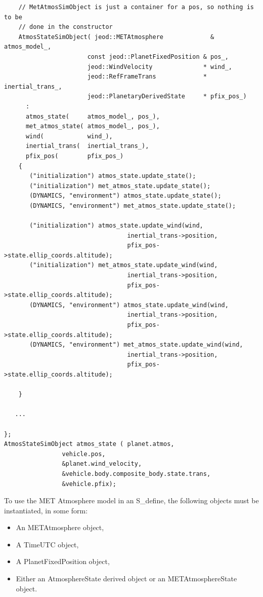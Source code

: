 \begin{verbatim}
    // MetAtmosSimObject is just a container for a pos, so nothing is to be
    // done in the constructor
    AtmosStateSimObject( jeod::METAtmosphere             & atmos_model_,
                       const jeod::PlanetFixedPosition & pos_,
                       jeod::WindVelocity              * wind_,
                       jeod::RefFrameTrans             * inertial_trans_,
                       jeod::PlanetaryDerivedState     * pfix_pos_)
      :
      atmos_state(     atmos_model_, pos_),
      met_atmos_state( atmos_model_, pos_),
      wind(            wind_),
      inertial_trans(  inertial_trans_),
      pfix_pos(        pfix_pos_)
    {
       ("initialization") atmos_state.update_state();
       ("initialization") met_atmos_state.update_state();
       (DYNAMICS, "environment") atmos_state.update_state();
       (DYNAMICS, "environment") met_atmos_state.update_state();

       ("initialization") atmos_state.update_wind(wind,
                                  inertial_trans->position,
                                  pfix_pos->state.ellip_coords.altitude);
       ("initialization") met_atmos_state.update_wind(wind,
                                  inertial_trans->position,
                                  pfix_pos->state.ellip_coords.altitude);
       (DYNAMICS, "environment") atmos_state.update_wind(wind,
                                  inertial_trans->position,
                                  pfix_pos->state.ellip_coords.altitude);
       (DYNAMICS, "environment") met_atmos_state.update_wind(wind,
                                  inertial_trans->position,
                                  pfix_pos->state.ellip_coords.altitude);

    }

   ...

};
AtmosStateSimObject atmos_state ( planet.atmos,
                vehicle.pos,
                &planet.wind_velocity,
                &vehicle.body.composite_body.state.trans,
                &vehicle.pfix);

\end{verbatim}

To use the MET Atmosphere model in an S\_define, the following objects must
be instantiated, in some form:

\begin{itemize}
\item An METAtmosphere object,
\item A TimeUTC object,
\item A PlanetFixedPosition object,
\item Either an AtmosphereState derived object or an METAtmosphereState object.
\end{itemize}

